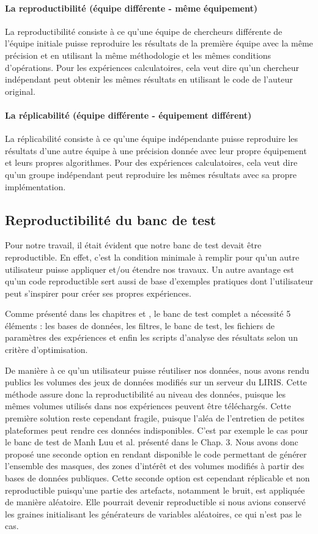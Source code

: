 \paragraph{La reproductibilité (équipe différente - même équipement)}
La reproductibilité consiste à ce qu'une équipe de chercheurs différente de l'équipe initiale puisse reproduire les résultats de la première équipe avec la même précision et en utilisant la même méthodologie et les mêmes conditions d'opérations. Pour les expériences calculatoires, cela veut dire qu'un chercheur indépendant peut obtenir les mêmes résultats en utilisant le code de l'auteur original.
\paragraph{La réplicabilité (équipe différente - équipement différent)}
La réplicabilité consiste à ce qu'une équipe indépendante puisse reproduire les résultats d'une autre équipe à une précision donnée avec leur propre équipement et leurs propres algorithmes. Pour des expériences calculatoires, cela veut dire qu'un groupe indépendant peut reproduire les mêmes résultats avec sa propre implémentation.
\subsection{Reproductibilité du banc de test}
Pour notre travail, il était évident que notre banc de test devait être reproductible. En effet, c'est la condition minimale à remplir pour qu'un autre utilisateur puisse appliquer et/ou étendre nos travaux. Un autre avantage est qu'un code reproductible sert aussi de base d'exemples pratiques dont l'utilisateur peut s'inspirer pour créer ses propres expériences.

Comme présenté dans les chapitres \chapBenchN{} et \chapAnalysisN{}, le banc de test complet a nécessité 5 éléments : les bases de données, les filtres, le banc de test, les fichiers de paramètres des expériences et enfin les scripts d'analyse des résultats selon un critère d'optimisation.

De manière à ce qu'un utilisateur puisse réutiliser nos données, nous avons rendu publics les volumes des jeux de données modifiés sur un serveur du LIRIS. Cette méthode assure donc la reproductibilité au niveau des données, puisque les mêmes volumes utilisés dans nos expériences peuvent être téléchargés. Cette première solution reste cependant fragile, puisque l'aléa de l'entretien de petites plateformes peut rendre ces données indisponibles. C'est par exemple le cas pour le banc de test de Manh Luu et al. présenté dans le Chap. 3. Nous avons donc proposé une seconde option en rendant disponible le code permettant de générer l'ensemble des masques, des zones d'intérêt et des volumes modifiés à partir des bases de données publiques. Cette seconde option est cependant réplicable et non reproductible puisqu'une partie des artefacts, notamment le bruit, est appliquée de manière aléatoire. Elle pourrait devenir reproductible si nous avions conservé les graines initialisant les générateurs de variables aléatoires, ce qui n'est pas le cas.  


